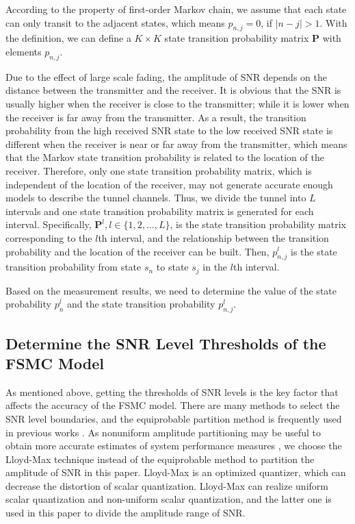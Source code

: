 \documentclass[conference]{IEEEtran}
\begin{document}
According to the property of first-order Markov chain, we assume that each state can only transit to the adjacent states, which means $p_{n,j}=0$, if $\mid{n-j}\mid>1$. With the definition, we can define a $K\times K$ state transition probability matrix $\textbf{P}$ with elements $p_{n,j}$.

Due to the effect of large scale fading, the amplitude of SNR depends on the distance between the transmitter and the receiver. It is obvious that the SNR is usually higher when the receiver is close to the transmitter; while it is lower when the receiver is far away from the transmitter. As a result, the transition probability from the high received SNR state to the low received SNR state is different when the receiver is near or far away from the transmitter, which means that the Markov state transition probability is related to the location of  the receiver.
Therefore, only one state transition probability matrix, which is independent of the location of the receiver, may not generate accurate enough models to describe the tunnel channels. Thus, we divide the tunnel into $L$ intervals and one state transition probability matrix is generated for each interval. Specifically, $\textbf{P}^{l}, l \in \{1, 2, ..., L\}$, is the state transition probability matrix corresponding to the $l$th interval, and the relationship between the transition probability and the location of the receiver can be built. Then, $p_{n, j}^{l}$ is the state transition probability from state $s_{n}$ to state $s_{j}$ in the $l$th interval.



Based on the measurement results, we need to determine the value of the state probability $p_{n}^{l}$ and the state transition probability $p_{n,j}^{l}$.






\subsection{Determine the SNR Level Thresholds of the FSMC Model}
As mentioned above, getting the thresholds of SNR levels is the key factor that affects the accuracy  of the FSMC model. There are many methods to select the SNR level boundaries, and the equiprobable partition method is frequently used in previous works \cite{Finite_state_Markov_channel_a_useful_model_for_radio_communication_channels,Finite-state_Markov_modeling_of_correlated_Rician-fading_channels,Fast_simulation_of_diversity_Nakagami_fading_channels_using_finite-state_Markov_models}. As nonuniform amplitude partitioning may be useful to obtain more accurate estimates of system performance measures \cite{Finite-state_Markov_modeling_of_fading_channels_a_survey_of_principles_and_applications}, we choose the Lloyd-Max technique \cite{Least_squares_quantization_in_PCM} instead of the equiprobable method to partition the amplitude of SNR in this paper. Lloyd-Max is an optimized quantizer, which can decrease the distortion of scalar quantization. Lloyd-Max can realize uniform scalar quantization and non-uniform scalar quantization, and the latter one is used in this paper to divide the amplitude range of SNR.
\end{document}
